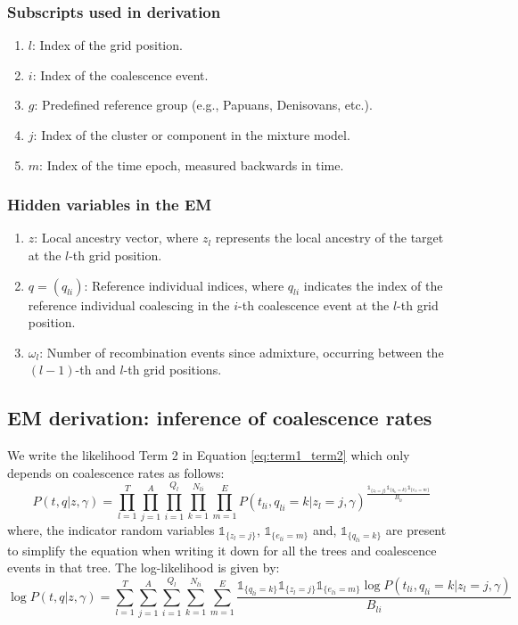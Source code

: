 \subsubsection{Subscripts used in derivation}
    
\begin{enumerate}
\itemsep-0.3em 
    \item $l$: Index of the grid position.
    \item $i$: Index of the coalescence event.
    \item $g$: Predefined reference group (e.g., Papuans, Denisovans, etc.).
    \item $j$: Index of the cluster or component in the mixture model.
    \item $m$: Index of the time epoch, measured backwards in time.
\end{enumerate}


\subsubsection{Hidden variables in the EM}
    
\begin{enumerate}
\itemsep-0.3em 
    \item $z$: Local ancestry vector, where $z_l$ represents the local ancestry of the target at the $l$-th grid position.
    \item $q = (q_{li})$: Reference individual indices, where $q_{li}$ indicates the index of the reference individual coalescing in the $i$-th coalescence event at the $l$-th grid position.
    \item $\omega_l$: Number of recombination events since admixture, occurring between the $(l-1)$-th and $l$-th grid positions.
\end{enumerate}

\subsection{EM derivation: inference of coalescence rates}
\label{sec:gb_em_coalrates}
We write the likelihood Term 2 in Equation \ref{eq:term1_term2} which only depends on coalescence rates as follows: 
\begin{equation}
     P(t, q \vert z, \gamma) = \prod_{l = 1}^T \prod_{j = 1}^A \prod_{i = 1}^{Q_l} \prod_{k =1}^{N_{li}} \prod_{m = 1}^E   P(t_{li}, q_{l i} = k \vert z_l = j, \gamma) ^ {\frac{\mathds{1}_{\{z_l = j\}}\mathds{1}_{\{q_{l i} = k\}}  \mathds{1}_{\{e_{l i} = m\}}}{B_{li}}}
\label{eq:scaled_ll}
\end{equation}
where, the indicator random variables $\mathds{1}_{\{z_l = j\}}$, $\mathds{1}_{\{e_{l i} = m\}}$ and, $\mathds{1}_{\{q_{l i} = k\}}$ are present to simplify the equation when writing it down for all the trees and coalescence events in that tree. The log-likelihood is given by:
\begin{equation}
     \log P(t, q \vert z, \gamma) = \sum_{l = 1}^T \sum_{j = 1}^A \sum_{i = 1}^{Q_l} \sum_{k =1}^{N_{li}} \sum_{m = 1}^E  \frac{\mathds{1}_{\{q_{l i} = k\}} \mathds{1}_{\{z_l = j\}} \mathds{1}_{\{e_{l i} = m\}} \log P(t_{li}, q_{l i} = k \vert z_l = j, \gamma)}{B_{li}} 
\end{equation}

